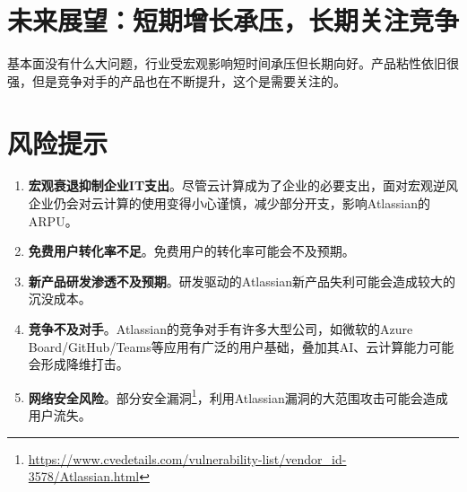\section{未来展望：短期增长承压，长期关注竞争}
基本面没有什么大问题，行业受宏观影响短时间承压但长期向好。产品粘性依旧很强，但是竞争对手的产品也在不断提升，这个是需要关注的。
\section{风险提示}
\begin{enumerate}
    \item \textbf{宏观衰退抑制企业IT支出}。尽管云计算成为了企业的必要支出，面对宏观逆风企业仍会对云计算的使用变得小心谨慎，减少部分开支，影响Atlassian的ARPU。
    \item \textbf{免费用户转化率不足}。免费用户的转化率可能会不及预期。
    \item \textbf{新产品研发渗透不及预期}。研发驱动的Atlassian新产品失利可能会造成较大的沉没成本。
    \item \textbf{竞争不及对手}。Atlassian的竞争对手有许多大型公司，如微软的Azure Board/GitHub/Teams等应用有广泛的用户基础，叠加其AI、云计算能力可能会形成降维打击。
    \item \textbf{网络安全风险}。部分安全漏洞\footnote{\url{https://www.cvedetails.com/vulnerability-list/vendor_id-3578/Atlassian.html}}，利用Atlassian漏洞的大范围攻击可能会造成用户流失。
\end{enumerate}
